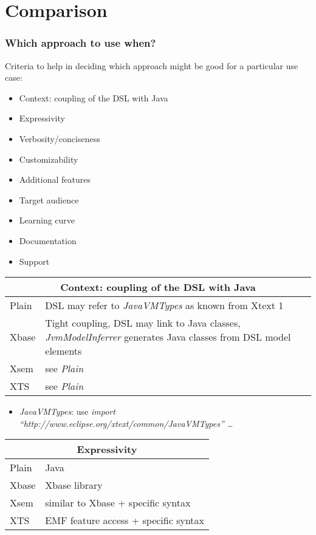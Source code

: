 \section{Comparison}

\begin{frame}
  \frametitle{Which approach to use when?}
  
  Criteria to help in deciding which approach might be good for a particular use
  case:
  \begin{itemize}
    \item Context: coupling of the DSL with Java
    \item Expressivity
    \item Verbosity/conciseness
    \item Customizability
    \item Additional features
    \item Target audience
    \item Learning curve
    \item Documentation
    \item Support
  \end{itemize}

\framebreak  
\begin{tabularx}{\linewidth}{ l   X }
\multicolumn{2}{c}{Context: coupling of the DSL with Java} \\ \hline
Plain & DSL may refer to \emph{JavaVMTypes} as known from Xtext 1\\
Xbase & Tight coupling, DSL may link to Java classes, \emph{JvmModelInferrer}
generates Java classes from DSL model elements\\
Xsem & see \emph{Plain} \\
XTS & see \emph{Plain} \\
\end{tabularx}
\begin{itemize}
  \item \emph{JavaVMTypes}: use \emph{import
  ``http://\-www.eclipse.org/\-xtext/\-common/\-JavaVMTypes'' \ldots}
\end{itemize}

\framebreak
\begin{tabularx}{\linewidth}{ l   X }
\multicolumn{2}{c}{Expressivity} \\ \hline
Plain & Java \\
Xbase & Xbase library \\
Xsem & similar to Xbase + specific syntax\\
XTS & EMF feature access + specific syntax\\
\end{tabularx}


\end{frame}
